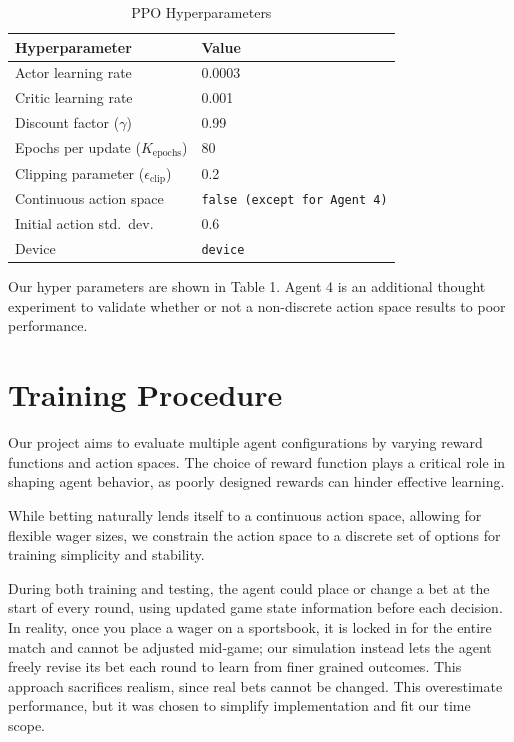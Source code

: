 \documentclass[sigconf]{acmart}
\begin{document}
\begin{table}[h]
  \caption{PPO Hyperparameters}
  \label{tab:ppo-hyperparams}
  \begin{tabular}{@{}ll@{}}
    \toprule
    \textbf{Hyperparameter} & \textbf{Value} \\
    \midrule
    Actor learning rate & 0.0003 \\
    Critic learning rate & 0.001 \\
    Discount factor ($\gamma$) & 0.99 \\
    Epochs per update ($K_{\text{epochs}}$) & 80 \\
    Clipping parameter ($\epsilon_{\text{clip}}$) & 0.2 \\
    Continuous action space & \texttt{false (except for Agent 4)} \\
    Initial action std.\ dev.\ & 0.6 \\
    Device & \texttt{device} \\
    \bottomrule
  \end{tabular}
\end{table}

Our hyper parameters are shown in Table 1. Agent 4 is an additional thought experiment to validate whether or not a non-discrete action space results to poor performance.

\section{Training Procedure}

Our project aims to evaluate multiple agent configurations by varying reward functions and action spaces. The choice of reward function plays a critical role in shaping agent behavior, as poorly designed rewards can hinder effective learning.

While betting naturally lends itself to a continuous action space, allowing for flexible wager sizes, we constrain the action space to a discrete set of options for training simplicity and stability.

During both training and testing, the agent could place or change a bet at the start of every round, using updated game state information before each decision. In reality, once you place a wager on a sportsbook, it is locked in for the entire match and cannot be adjusted mid‐game; our simulation instead lets the agent freely revise its bet each round to learn from finer grained outcomes. This approach sacrifices realism, since real bets cannot be changed. This overestimate performance, but it was chosen to simplify implementation and fit our time scope.
\end{document}
